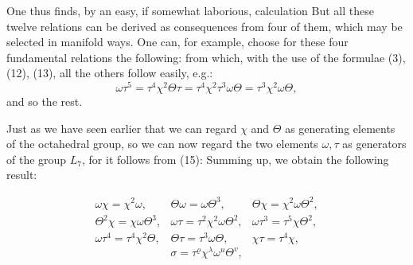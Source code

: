 One thus finds, by an easy, if somewhat laborious, calculation
But all these twelve relations can be derived as consequences
from four of them, which may be selected in manifold ways.
One can, for example, choose for these four fundamental
relations the following:
from which, with the use of the formulae (3), (12), (13), all the others
follow easily, e.g.:
\[
\omega\tau^5 = \tau^4\chi^2\Theta\tau = \tau^4\chi^2\tau^3\omega\Theta = \tau^3\chi^2\omega\Theta,
\]
and so the rest.

Just as we have seen earlier that we can regard $\chi$ and $\Theta$
as generating elements of the octahedral group, so we can
now regard the two elements $\omega, \tau$ as generators of the group
$L_7$, for it follows from (15):
Summing up, we obtain the following result:

\[
\begin{array}{ccc}
\omega\chi = \chi^2\omega, & \Theta\omega = \omega\Theta^3, & \Theta\chi = \chi^2\omega\Theta^2,\\
\Theta^2\chi = \chi\omega\Theta^3, & \omega\tau = \tau^2\chi^2\omega\Theta^2, & \omega\tau^3 = \tau^5\chi\Theta^2,\\
\omega\tau^4 = \tau^4\chi^2\Theta, & \Theta\tau = \tau^3\omega\Theta, & \chi\tau = \tau^4\chi,
\end{array}
\]
\[
\sigma = \tau^\varrho \chi^\lambda \omega^u \Theta^v,
\]
